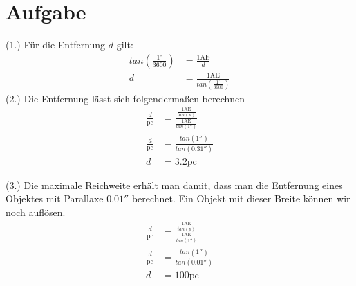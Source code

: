 \documentclass{article}
\begin{document}
	\section{Aufgabe}
	\begin{minipage}{0.19\textwidth}
	\end{minipage}
	\begin{minipage}{0.8\textwidth}
	(1.) Für die Entfernung $d$ gilt:
	\begin{align*}
	tan(\frac{1^\circ}{3600})&=\frac{1\mathrm{AE}}{d}\\
	d &= \frac{1\mathrm{AE}}{tan(\frac{1^\circ}{3600})}
	\end{align*}
	(2.) Die Entfernung lässt sich folgendermaßen berechnen
	\begin{align*}
		\frac{d}{\mathrm{pc}}&=\frac{\frac{1\mathrm{AE}}{tan(p)}}{\frac{1\mathrm{AE}}{tan(1'')}}\\
		\frac{d}{\mathrm{pc}}&=\frac{tan(1'')}{tan(0.31'')}\\
		d&=3.2 \mathrm{pc}
	\end{align*}
	\end{minipage}
	(3.) Die maximale Reichweite erhält man damit, dass man die Entfernung eines Objektes mit Parallaxe $0.01''$ berechnet. Ein Objekt mit dieser Breite können wir noch auflösen.
	\begin{align*}
	\frac{d}{\mathrm{pc}}&=\frac{\frac{1\mathrm{AE}}{tan(p)}}{\frac{1\mathrm{AE}}{tan(1'')}}\\
	\frac{d}{\mathrm{pc}}&=\frac{tan(1'')}{tan(0.01'')}\\
	d&=100 \mathrm{pc}
	\end{align*}
\end{document}
